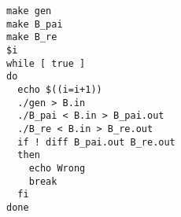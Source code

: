 \begin{lstlisting}
make gen
make B_pai
make B_re
$i
while [ true ]
do
  echo $((i=i+1))
  ./gen > B.in
  ./B_pai < B.in > B_pai.out
  ./B_re < B.in > B_re.out
  if ! diff B_pai.out B_re.out
  then
    echo Wrong
    break
  fi
done

\end{lstlisting}